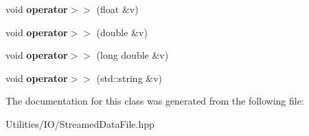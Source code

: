 \begin{DoxyCompactItemize}
\item 
\hypertarget{classatl_1_1_streamed_data_file_a1927ecf5f6fb12a6ae3ab6ed7a9d479b}{void {\bfseries operator$>$$>$} (float \&v)}\label{classatl_1_1_streamed_data_file_a1927ecf5f6fb12a6ae3ab6ed7a9d479b}

\item 
\hypertarget{classatl_1_1_streamed_data_file_ac29592c8193459c0289a712712d8df3f}{void {\bfseries operator$>$$>$} (double \&v)}\label{classatl_1_1_streamed_data_file_ac29592c8193459c0289a712712d8df3f}

\item 
\hypertarget{classatl_1_1_streamed_data_file_aefb6dc4e7e31bf2aa1e5691228cee31f}{void {\bfseries operator$>$$>$} (long double \&v)}\label{classatl_1_1_streamed_data_file_aefb6dc4e7e31bf2aa1e5691228cee31f}

\item 
\hypertarget{classatl_1_1_streamed_data_file_a2fbe46b06b1947c479afd3ac2627f87c}{void {\bfseries operator$>$$>$} (std\+::string \&v)}\label{classatl_1_1_streamed_data_file_a2fbe46b06b1947c479afd3ac2627f87c}

\end{DoxyCompactItemize}


The documentation for this class was generated from the following file\+:\begin{DoxyCompactItemize}
\item 
Utilities/\+I\+O/Streamed\+Data\+File.\+hpp\end{DoxyCompactItemize}
